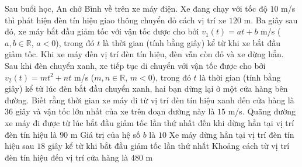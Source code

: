 \begin{ex}%
	Sau buổi học, An chở Bình về trên xe máy điện. Xe đang chạy với tốc độ $10$ m/s thì phát hiện đèn tín hiệu giao thông chuyển đỏ cách vị trí xe $120$ m. Ba giây sau đó, xe máy bắt đầu giảm tốc với vận tốc được cho bởi $v_1(t) = at + b$ m/s ($a, b \in \mathbb{R}$, $a < 0$), trong đó $t$ là thời gian (tính bằng giây) kể từ khi xe bắt đầu giảm tốc. Khi xe máy đến vị trí đèn tín hiệu, đèn vẫn còn đỏ và xe dừng hẳn. Sau khi đèn chuyển xanh, xe tiếp tục di chuyển với vận tốc được cho bởi $v_2(t) = mt^2 + nt$ m/s ($m, n \in \mathbb{R}$, $m < 0$), trong đó $t$ là thời gian (tính bằng giây) kể từ lúc đèn bắt đầu chuyển xanh, hai bạn dừng lại ở một cửa hàng bên đường. Biết rằng thời gian xe máy đi từ vị trí đèn tín hiệu xanh đến cửa hàng là $36$ giây và vận tốc lớn nhất của xe trên đoạn đường này là $15$ m/s.
	\choiceTF
	{\True Quãng đường xe máy đi được từ lúc bắt đầu giảm tốc lần thứ nhất đến khi dừng hẳn tại vị trí đèn tín hiệu là $90$ m}
	{\True Giá trị của hệ số $b$ là $10$}
	{\True Xe máy dừng hẳn tại vị trí đèn tín hiệu sau $18$ giây kể từ khi bắt đầu giảm tốc lần thứ nhất}
	{Khoảng cách từ vị trí đèn tín hiệu đến vị trí cửa hàng là $480$ m}
\end{ex}
